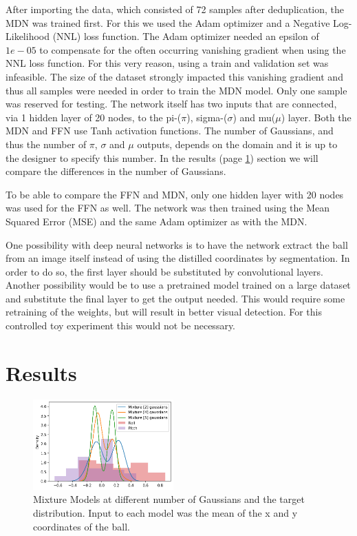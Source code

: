 \documentclass{article}
\begin{document}
    After importing the data, which consisted of 72 samples after deduplication, the MDN was trained first.
    For this we used the Adam optimizer and a Negative Log-Likelihood (NNL) loss function.
    The Adam optimizer needed an epsilon of $1e-05$ to compensate for the often occurring vanishing gradient when using the NNL loss function.
    For this very reason, using a train and validation set was infeasible. 
    The size of the dataset strongly impacted this vanishing gradient and thus all samples were needed in order to train the MDN model.   
    Only one sample was reserved for testing.
    The network itself has two inputs that are connected, via 1 hidden layer of 20 nodes, to the pi-($\pi$), sigma-($\sigma$) and mu($\mu$) layer.
    Both the MDN and FFN use Tanh activation functions.
    The number of Gaussians, and thus the number of $\pi$, $\sigma$ and $\mu$ outputs, depends on the domain and it is up to the designer to specify this number.
    In the results (page \ref{sec:results}) section we will compare the differences in the number of Gaussians.

    To be able to compare the FFN and MDN, only one hidden layer with 20 nodes was used for the FFN as well.
    The network was then trained using the Mean Squared Error (MSE) and the same Adam optimizer as with the MDN.

    One possibility with deep neural networks is to have the network extract the ball from an image itself instead of using the distilled coordinates by segmentation. 
    In order to do so, the first layer should be substituted by convolutional layers.
    Another possibility would be to use a pretrained model trained on a large dataset and substitute the final layer to get the output needed.
    This would require some retraining of the weights, but will result in better visual detection.
    For this controlled toy experiment this would not be necessary.


    \section{Results}\label{sec:results}
    \begin{figure}
        \begin{center}
          \includegraphics[trim=0 0 0 23pt,width=0.48\textwidth]{../part2/20kepochs_distr.png}
        \end{center}
        \caption{Mixture Models at different number of Gaussians and the target distribution. Input to each model was the mean of the x and y coordinates of the ball.}
        \label{fig:learned-mix-model}
        \vspace{-40pt}
    \end{figure}
\end{document}
